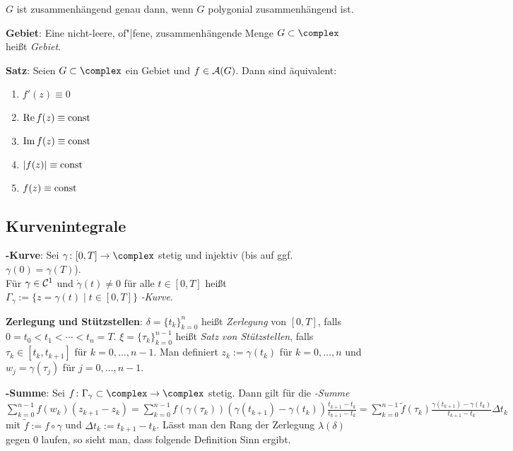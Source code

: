 $G$ ist zusammenhängend genau dann, wenn $G$ polygonial zusammenhängend ist.

\linie

\textbf{Gebiet}:
Eine nicht-leere, of"|fene, zusammenhängende Menge $G \subset \complex$ heißt
\emph{Gebiet}.

\linie

\textbf{Satz}:
Seien $G \subset \complex$ ein Gebiet und $f \in \mathcal{A}(G)$.
Dann sind äquivalent:
\begin{enumerate}
    \item
    $f'(z) \equiv 0$

    \item
    $\operatorname{Re} f(z) \equiv \operatorname{const}$

    \item
    $\operatorname{Im} f(z) \equiv \operatorname{const}$

    \item
    $|f(z)| \equiv \operatorname{const}$

    \item

    $f(z) \equiv \operatorname{const}$
\end{enumerate}

\subsection{%
    Kurvenintegrale%
}

\textbf{-Kurve}:
Sei $\gamma\colon [0, T] \rightarrow \complex$ stetig und injektiv
(bis auf ggf. $\gamma(0) = \gamma(T)$).\\
Für $\gamma \in \mathcal{C}^1$ und $\dot{\gamma}(t) \not= 0$ für alle $t \in [0, T]$
heißt $\Gamma_\gamma := \{z = \gamma(t) \;|\; t \in [0, T]\}$
\emph{-Kurve}.

\textbf{Zerlegung und Stützstellen}:
$\delta = \{t_k\}_{k=0}^n$ heißt \emph{Zerlegung} von $[0, T]$, falls\\
$0 = t_0 < t_1 < \dotsb < t_n = T$.
$\xi = \{\tau_k\}_{k=0}^{n-1}$ heißt \emph{Satz von Stützstellen}, falls
$\tau_k \in [t_k, t_{k+1}]$ für $k = 0, \dotsc, n - 1$.
Man definiert $z_k := \gamma(t_k)$ für $k = 0, \dotsc, n$ und
$w_j = \gamma(\tau_j)$ für $j = 0, \dotsc, n - 1$.

\textbf{-Summe}:
Sei $f\colon \Gamma_\gamma \subset \complex \rightarrow \complex$ stetig.
Dann gilt für die \emph{-Summe}\\
$\sum_{k=0}^{n-1} f(w_k) (z_{k+1} - z_k)
= \sum_{k=0}^{n-1} f(\gamma(\tau_k)) (\gamma(t_{k+1}) - \gamma(t_k))
\frac{t_{k+1} - t_k}{t_{k+1} - t_k}
= \sum_{k=0}^{n-1} \widetilde{f}(\tau_k)
\frac{\gamma(t_{k+1}) - \gamma(t_k)}{t_{k+1} - t_k} \Delta t_k$\\
mit $\widetilde{f} := f \circ \gamma$ und $\Delta t_k := t_{k+1} - t_k$.
Lässt man den Rang der Zerlegung $\lambda(\delta)$ gegen $0$ laufen, so sieht
man, dass folgende Definition Sinn ergibt.


